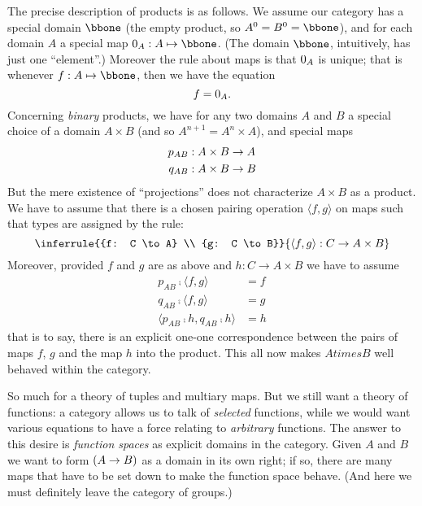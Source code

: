 The precise description of products is as follows. We assume our category has a special domain $\bbone$ (the empty product, so $A^0 = B^0 = {\bbone}$), and for each domain $A$ a special map $\zeromap_A: A \mapsto \bbone$. (The domain $\bbone$, intuitively, has just one ``element''.)  Moreover the rule about maps is that $0_A$ is unique; that is whenever $f : A \mapsto \bbone$, then we have the equation
$$f = 0_A .$$
%
Concerning {\it binary} products, we have for any two domains $A$ and $B$ a special choice of a domain $A \times B$ (and so $A^{n+1} = A^n \times A$), and special maps
\begin{align*}
p_{AB}&: A \times B \rightarrow A\\
q_{AB}&: A \times B \rightarrow B
\end{align*}
%
But the mere existence of ``projections'' does not characterize $A \times B$ as a product. We have to assume that there is a chosen pairing operation $\langle f,g \rangle$ on maps such that types are assigned by the rule:
%
$$
\inferrule
  {{f: C \to A} \\ {g: C \to B}}
  {\langle f,g \rangle: C \to A \times B}
$$
%
Moreover, provided $f$ and $g$ are as above and $h: C \to A \times B $ we have to assume
\begin{align*}
p_{AB} \comp \langle f,g \rangle &= f\\
q_{AB} \comp \langle f,g \rangle &= g\\
\langle p_{AB}\comp h, q_{AB}\comp h\rangle &= h
\end{align*}
%
that is to say, there is an explicit one-one correspondence between the pairs of maps $f$, $g$ and the map $h$ into the product. This all now makes $A times B$ well behaved within the category.

So much for a theory of tuples and multiary maps. But we still want a theory of functions: a category allows us to talk of {\it selected} functions, while we would want various equations to have a force relating to {\it arbitrary} functions. The answer to this desire is {\it function spaces} as explicit domains in the category. Given $A$ and $B$ we want to form $(A \rightarrow B)$ as a domain in its own right; if so, there are many maps that have to be set down to make the function space behave. (And here we must definitely leave the category of groups.)

